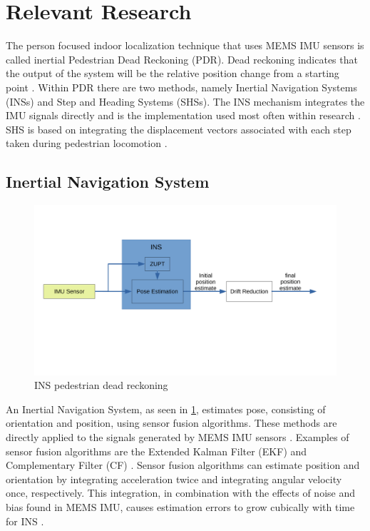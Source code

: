 \section{Relevant Research }
\label{sec:relevant_research}
The person focused indoor localization technique that uses MEMS IMU sensors is called inertial Pedestrian Dead Reckoning (PDR). Dead reckoning indicates that the output of the system will be the relative position change from a starting point \cite{Yu2018}. Within PDR there are two methods, namely Inertial Navigation Systems (INSs) and Step and Heading Systems (SHSs). The INS mechanism integrates the IMU signals directly and is the implementation used most often within research \cite{Diez2018b}. SHS is based on integrating the displacement vectors associated with each step taken during pedestrian locomotion \cite{Davidson2017}.  \par

\subsection{Inertial Navigation System}
\label{sec:INS}
\begin{figure}[H]
	\centering
	\includegraphics[trim=20 140 290 80, clip, width=0.8\linewidth]{images/INS_diagram}
	\caption{\ac{INS} pedestrian dead reckoning}
	\label{fig:ins_diagram}
\end{figure}
An Inertial Navigation System, as seen in \cref{fig:ins_diagram}, estimates pose, consisting of orientation and position, using sensor fusion algorithms. These methods are directly applied to the signals generated by MEMS IMU sensors \cite{Wu2019}. Examples of sensor fusion algorithms are the Extended Kalman Filter (EKF) and Complementary Filter (CF) \cite{Kok2017}. Sensor fusion algorithms can estimate position and orientation by integrating acceleration twice and integrating angular velocity once, respectively. This integration, in combination with the effects of noise and bias found in MEMS IMU, causes estimation errors to grow cubically with time for INS \cite{Harle2013}. \par

